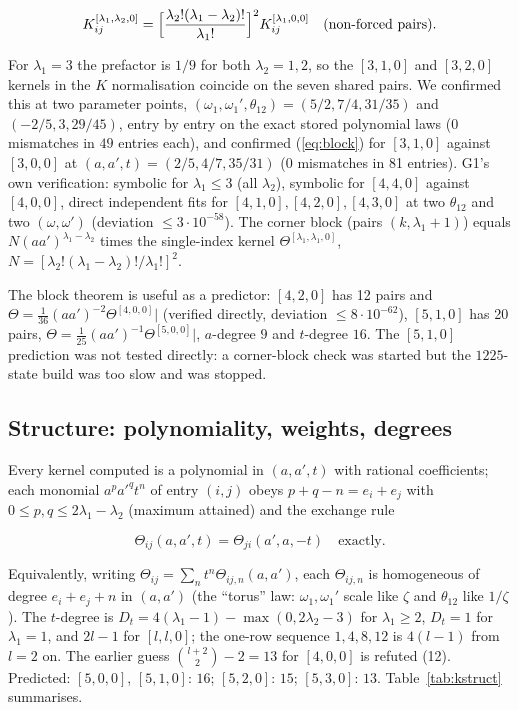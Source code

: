 \documentclass[11pt]{article}
\begin{document}
\begin{equation}
K^{[\lambda_1,\lambda_2,0]}_{ij}=\Bigl[\frac{\lambda_2!(\lambda_1-\lambda_2)!}{\lambda_1!}\Bigr]^2K^{[\lambda_1,0,0]}_{ij}\quad(\text{non-forced pairs}).\label{eq:blockK}
\end{equation}

For $\lambda_1=3$ the prefactor is $1/9$ for both $\lambda_2=1,2$, so the $[3,1,0]$ and $[3,2,0]$ kernels in the $K$ normalisation coincide on the seven shared pairs.
We confirmed this at two parameter points, $(\omega_1,\omega_1',\theta_{12})=(5/2,7/4,31/35)$ and $(-2/5,3,29/45)$, entry by entry on the exact stored polynomial laws (0 mismatches in $49$ entries each), and confirmed (\ref{eq:block}) for $[3,1,0]$ against $[3,0,0]$ at $(a,a',t)=(2/5,4/7,35/31)$ (0 mismatches in 81 entries).
G1's own verification: symbolic for $\lambda_1\le3$ (all $\lambda_2$), symbolic for $[4,4,0]$ against $[4,0,0]$, direct independent fits for $[4,1,0],[4,2,0],[4,3,0]$ at two $\theta_{12}$ and two $(\omega,\omega')$ (deviation $\le3\cdot10^{-58}$).
The corner block (pairs $(k,\lambda_1+1)$) equals $N(aa')^{\lambda_1-\lambda_2}$ times the single-index kernel $\Theta^{[\lambda_1,\lambda_1,0]}$, $N=[\lambda_2!(\lambda_1-\lambda_2)!/\lambda_1!]^2$.

The block theorem is useful as a predictor: $[4,2,0]$ has 12 pairs and $\Theta=\tfrac1{36}(aa')^{-2}\Theta^{[4,0,0]}|$ (verified directly, deviation $\le8\cdot10^{-62}$), $[5,1,0]$ has 20 pairs, $\Theta=\tfrac1{25}(aa')^{-1}\Theta^{[5,0,0]}|$, $a$-degree $9$ and $t$-degree $16$. The $[5,1,0]$ prediction was not tested directly: a corner-block check was started but the $1225$-state build was too slow and was stopped.

\subsection{Structure: polynomiality, weights, degrees}\label{sec:structure}

Every kernel computed is a polynomial in $(a,a',t)$ with rational coefficients; each monomial $a^pa'^qt^n$ of entry $(i,j)$ obeys $p+q-n=e_i+e_j$ with $0\le p,q\le2\lambda_1-\lambda_2$ (maximum attained) and the exchange rule

\begin{equation}
\Theta_{ij}(a,a',t)=\Theta_{ji}(a',a,-t)\quad\text{exactly}.\label{eq:exch}
\end{equation}

Equivalently, writing $\Theta_{ij}=\sum_nt^n\Theta_{ij,n}(a,a')$, each $\Theta_{ij,n}$ is homogeneous of degree $e_i+e_j+n$ in $(a,a')$ (the ``torus'' law: $\omega_1,\omega_1'$ scale like $\zeta$ and $\theta_{12}$ like $1/\zeta$).
The $t$-degree is $D_t=4(\lambda_1-1)-\max(0,2\lambda_2-3)$ for $\lambda_1\ge2$, $D_t=1$ for $\lambda_1=1$, and $2l-1$ for $[l,l,0]$; the one-row sequence $1,4,8,12$ is $4(l-1)$ from $l=2$ on.
The earlier guess $\binom{l+2}2-2=13$ for $[4,0,0]$ is refuted (12).
Predicted: $[5,0,0]$, $[5,1,0]$: $16$; $[5,2,0]$: $15$; $[5,3,0]$: $13$. Table~\ref{tab:kstruct} summarises.
\end{document}
